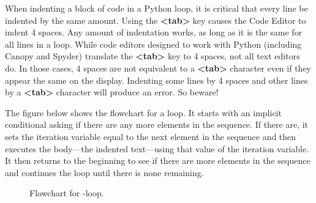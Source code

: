 \documentclass[letterpaper,10pt,english]{sphinxmanual}
\begin{document}
When indenting a block of code in a Python  loop, it is critical that every line be indented by the same amount.  Using the \textbf{\textless{}tab\textgreater{}} key causes the Code Editor to indent 4 spaces.  Any amount of indentation works, as long as it is the same for all lines in a  loop.  While code editors designed to work with Python (including Canopy and Spyder) translate the \textbf{\textless{}tab\textgreater{}} key to 4 spaces, not all text editors do.  In those cases, 4 spaces are not equivalent to a \textbf{\textless{}tab\textgreater{}} character even if they appear the same on the display.  Indenting some lines by 4 spaces and other lines by a \textbf{\textless{}tab\textgreater{}} character will produce an error.  So beware!

The figure below shows the flowchart for a  loop.  It starts with an implicit conditional asking if there are any more elements in the sequence.  If there are, it sets the iteration variable equal to the next element in the sequence and then executes the body---the indented text---using that value of the iteration variable.  It then  returns to the beginning to see if there are more elements in the sequence and continues the loop until there is none remaining.
\begin{figure}[htbp]
\centering
\capstart

\caption{Flowchart for -loop.}\label{chap6/chap6_loopsconds:fig-flow-for}\end{figure}
\end{document}
